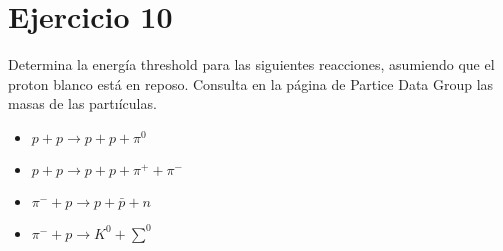 \section*{Ejercicio 10}
Determina la energía threshold para las siguientes reacciones, asumiendo que el proton blanco está
en reposo. Consulta en la página de Partice Data Group las masas de las partıículas.
\begin{itemize}
    \item $p+p \rightarrow p+p+\pi^0$\\
    \item $p+p \rightarrow p+p+\pi^++\pi^-$
    \item $\pi^-+p \rightarrow p+\bar{p}+n$
    \item $\pi^-+p \rightarrow K^0+\sum^0$
\end{itemize}